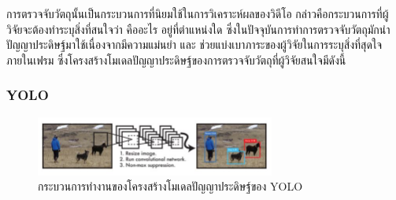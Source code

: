 การตรวจจับวัตถุนั้นเป็นกระบวนการที่นิยมใช้ในการวิเคราะห์ผลของวิดีโอ กล่าวคือกระบวนการที่ผู้วิจัยจะต้องทำระบุสิ่งที่สนใจว่า คืออะไร อยู่ที่ตำแหน่งใด 
ซึ่งในปัจจุบันการทำการตรวจจับวัตถุมักนำปัญญาประดิษฐ์มาใช้เนื่องจากมีความแม่นยำ และ ช่วยแบ่งเบาภาระของผู้วิจัยในการระบุสิ่งที่สุดใจภายในเฟรม ซึ่งโครงสร้างโมเดลปัญญาประดิษฐ์ของการตรวจจับวัตถุที่ผู้วิจัยสนใจมีดังนี้

\subsubsection*{YOLO}
\begin{figure}[!ht]
    \centering
    \includegraphics[width=0.7\textwidth]{chapter2/images/yolo.jpg}
    \caption{กระบวนการทำงานของโครงสร้างโมเดลปัญญาประดิษฐ์ของ YOLO}
    \label{fig:yolo}
\end{figure}

